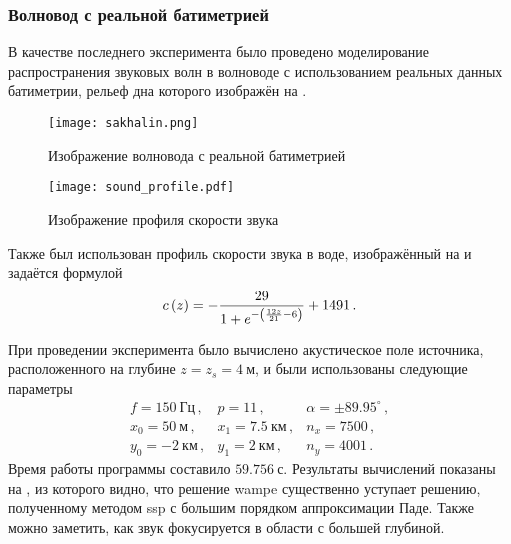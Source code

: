\documentclass[../document.tex]{subfiles}
\begin{document}
            \subsubsection{Волновод с реальной батиметрией}
                \par В качестве последнего эксперимента было проведено моделирование распространения звуковых волн в волноводе с использованием реальных данных батиметрии, рельеф дна которого изображён на .
                \begin{figure}[h]
                    \centering
                    \texttt{[image: sakhalin.png]}
                    \caption{Изображение волновода с реальной батиметрией\label{fig::sakhalin}}
                \end{figure}
                \begin{figure}[h]
                    \centering
                    \texttt{[image: sound\_profile.pdf]}
                    \caption{Изображение профиля скорости звука\label{fig::sakhalin_sound_profile}}
                \end{figure}
                Также был использован профиль скорости звука в воде, изображённый на  и задаётся формулой
                \begin{equation}
                    c\left(z\right)=-\frac{29}{1+e^{-\left(\frac{12z}{21}-6\right)}}+1491\,.
                \end{equation}
                \par При проведении эксперимента было вычислено акустическое поле источника, расположенного на глубине $z=z_s=4\ \text{м}$, и были использованы следующие параметры
                \begin{equation}
                    \begin{array}{ccc}
                        f=150\ \text{Гц}\,,&p=11\,,&\alpha=\pm89.95^\circ\,,\\
                        x_0=50\ \text{м}\,,&x_1=7.5\ \text{км}\,,&n_x=7500\,,\\
                        y_0=-2\ \text{км}\,,&y_1=2\ \text{км}\,,&n_y=4001\,.
                    \end{array}
                \end{equation}
                Время работы программы составило $59.756\ \text{с}$. Результаты вычислений показаны на , из которого видно, что решение \acrshort{wampe} существенно уступает решению, полученному методом \acrshort{ssp} с большим порядком аппроксимации Паде. Также можно заметить, как звук фокусируется в области с большей глубиной.
\end{document}
